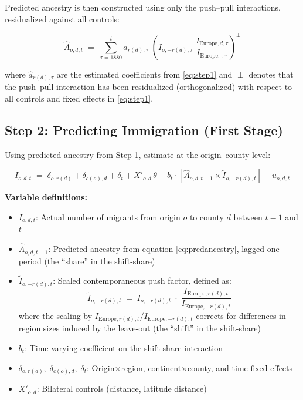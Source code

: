 \bigskip
\noindent Predicted ancestry is then constructed using only the push--pull interactions, residualized against all controls:

\begin{equation}\label{eq:predancestry}
\hat{A}_{o,d,t} \;=\; \sum_{\tau=1880}^{t} \hat{a}_{r(d),\tau}\;\left(I_{o,-r(d),\tau}\;\frac{I_{\text{Europe},d,\tau}}{I_{\text{Europe},\cdot,\tau}}\right)^{\!\perp}
\end{equation}

\noindent where $\hat{a}_{r(d),\tau}$ are the estimated coefficients from \eqref{eq:step1} and $\perp$ denotes that the push--pull interaction has been residualized (orthogonalized) with respect to all controls and fixed effects in \eqref{eq:step1}.

\subsection{Step 2: Predicting Immigration (First Stage)}

Using predicted ancestry from Step 1, estimate at the origin--county level:

\begin{equation}\label{eq:step2}
I_{o,d,t} \;=\; \delta_{o,r(d)} + \delta_{c(o),d} + \delta_t + X'_{o,d}\,\theta 
+ b_t \cdot \left[\hat{A}_{o,d,t-1} \times \tilde{I}_{o,-r(d),t}\right] + u_{o,d,t}
\end{equation}

\noindent\textbf{Variable definitions:}
\begin{itemize}
    \item $I_{o,d,t}$: Actual number of migrants from origin $o$ to county $d$ between $t{-}1$ and $t$
    \item $\hat{A}_{o,d,t-1}$: Predicted ancestry from equation \eqref{eq:predancestry}, lagged one period (the ``share'' in the shift-share)
    \item $\tilde{I}_{o,-r(d),t}$: Scaled contemporaneous push factor, defined as:
    \[
        \tilde{I}_{o,-r(d),t} \;=\; I_{o,-r(d),t} \;\cdot\; \frac{I_{\text{Europe},r(d),t}}{I_{\text{Europe},-r(d),t}}
    \]
    where the scaling by $I_{\text{Europe},r(d),t}/I_{\text{Europe},-r(d),t}$ corrects for differences in region sizes induced by the leave-out (the ``shift'' in the shift-share)
    \item $b_t$: Time-varying coefficient on the shift-share interaction
    \item $\delta_{o,r(d)},\;\delta_{c(o),d},\;\delta_t$: Origin$\times$region, continent$\times$county, and time fixed effects
    \item $X'_{o,d}$: Bilateral controls (distance, latitude distance)
\end{itemize}

